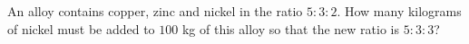 An alloy contains copper, zinc and nickel in the ratio $5:3:2$. How many kilograms of nickel must be added to $100$ kg of this alloy so that the new ratio is $5:3:3$?
